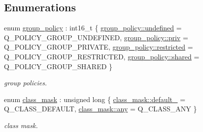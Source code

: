 \subsection*{Enumerations}
\begin{DoxyCompactItemize}
\item 
enum \hyperlink{namespacenet_aedc1a0dde937ddbd0800af02920b1067}{group\+\_\+policy} \+: int16\+\_\+t \{ \hyperlink{namespacenet_aedc1a0dde937ddbd0800af02920b1067a5e543256c480ac577d30f76f9120eb74}{group\+\_\+policy\+::undefined} = Q\+\_\+\+P\+O\+L\+I\+C\+Y\+\_\+\+G\+R\+O\+U\+P\+\_\+\+U\+N\+D\+E\+F\+I\+N\+E\+D, 
\hyperlink{namespacenet_aedc1a0dde937ddbd0800af02920b1067a908b453051b556e053731714a5193921}{group\+\_\+policy\+::priv} = Q\+\_\+\+P\+O\+L\+I\+C\+Y\+\_\+\+G\+R\+O\+U\+P\+\_\+\+P\+R\+I\+V\+A\+T\+E, 
\hyperlink{namespacenet_aedc1a0dde937ddbd0800af02920b1067ac89b33f8b3f6f452ef6f07d397b5dcdf}{group\+\_\+policy\+::restricted} = Q\+\_\+\+P\+O\+L\+I\+C\+Y\+\_\+\+G\+R\+O\+U\+P\+\_\+\+R\+E\+S\+T\+R\+I\+C\+T\+E\+D, 
\hyperlink{namespacenet_aedc1a0dde937ddbd0800af02920b1067a9e81e7b963c71363e2fb3eefcfecfc0e}{group\+\_\+policy\+::shared} = Q\+\_\+\+P\+O\+L\+I\+C\+Y\+\_\+\+G\+R\+O\+U\+P\+\_\+\+S\+H\+A\+R\+E\+D
 \}
\begin{DoxyCompactList}\small\item\em group policies. \end{DoxyCompactList}\item 
enum \hyperlink{namespacenet_a1dbd93552dc6ef6fbb0bb79d43ca22fd}{class\+\_\+mask} \+: unsigned long \{ \hyperlink{namespacenet_a1dbd93552dc6ef6fbb0bb79d43ca22fda172b03053216c6158fe380805998ad6c}{class\+\_\+mask\+::default\+\_\+} = Q\+\_\+\+C\+L\+A\+S\+S\+\_\+\+D\+E\+F\+A\+U\+L\+T, 
\hyperlink{namespacenet_a1dbd93552dc6ef6fbb0bb79d43ca22fda100b8cad7cf2a56f6df78f171f97a1ec}{class\+\_\+mask\+::any} = Q\+\_\+\+C\+L\+A\+S\+S\+\_\+\+A\+N\+Y
 \}
\begin{DoxyCompactList}\small\item\em class mask. \end{DoxyCompactList}\end{DoxyCompactItemize}
